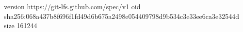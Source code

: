 version https://git-lfs.github.com/spec/v1
oid sha256:068a437b8f696f1fd49d6b675a2498e054409798d9b534c3e33ee6ca3e32544d
size 161244
